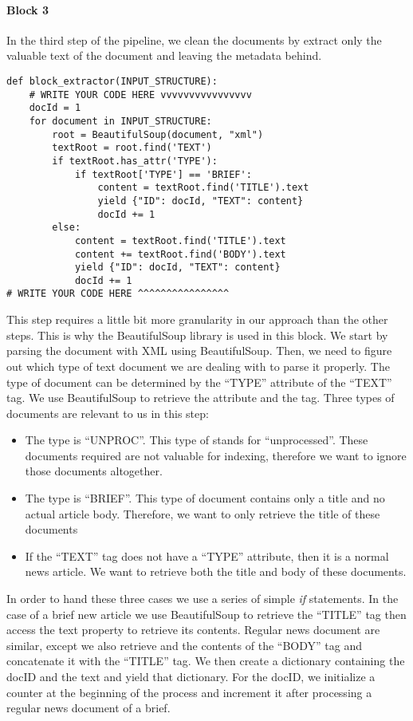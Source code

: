 \documentclass[]{report}
\begin{document}
\paragraph{Block 3}
In the third step of the pipeline, we clean the documents by extract only the valuable text of the document and leaving the metadata behind.
\begin{verbatim}
def block_extractor(INPUT_STRUCTURE):
	# WRITE YOUR CODE HERE vvvvvvvvvvvvvvvv
	docId = 1
	for document in INPUT_STRUCTURE:
		root = BeautifulSoup(document, "xml")
		textRoot = root.find('TEXT')
		if textRoot.has_attr('TYPE'):
			if textRoot['TYPE'] == 'BRIEF':
				content = textRoot.find('TITLE').text
				yield {"ID": docId, "TEXT": content}
				docId += 1
		else:
			content = textRoot.find('TITLE').text
			content += textRoot.find('BODY').text
			yield {"ID": docId, "TEXT": content}
			docId += 1
# WRITE YOUR CODE HERE ^^^^^^^^^^^^^^^^
\end{verbatim}
This step requires a little bit more granularity in our approach than the other steps. This is why the BeautifulSoup library is used in this block. We start by parsing the document with XML using BeautifulSoup. Then, we need to figure out which type of text document we are dealing with to parse it properly. The type of document can be determined by the ``TYPE'' attribute of the ``TEXT'' tag. We use BeautifulSoup to retrieve the attribute and the tag. Three types of documents are relevant to us in this step:
\begin{itemize}
	\item The type is ``UNPROC''. This type of stands for ``unprocessed''. These documents required are not valuable for indexing, therefore we want to ignore those documents altogether.
	\item The type is ``BRIEF''. This type of document contains only a title and no actual article body. Therefore, we want to only retrieve the title of these documents
	\item If the ``TEXT'' tag does not have a ``TYPE'' attribute, then it is a normal news article. We want to retrieve both the title and body of these documents.
\end{itemize}
In order to hand these three cases we use a series of simple \textit{if} statements. In the case of a brief new article we use BeautifulSoup to retrieve the ``TITLE'' tag then access the text property to retrieve its contents. Regular news document are similar, except we also retrieve and the contents of the ``BODY'' tag and concatenate it with the ``TITLE'' tag. We then create a dictionary containing the docID and the text and yield that dictionary. For the docID, we initialize a counter at the beginning of the process and increment it after processing a regular news document of a brief.
\end{document}
